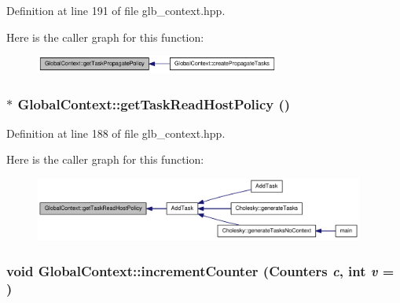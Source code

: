 Definition at line 191 of file glb\_\-context.hpp.

Here is the caller graph for this function:\nopagebreak
\begin{figure}[H]
\begin{center}
\leavevmode
\includegraphics[width=228pt]{class_global_context_a70524a314df10d540b267f34d297ec49_icgraph}
\end{center}
\end{figure}
\hypertarget{class_global_context_ab7afe64dbb26b367d9d49f098de7f158}{
\subsubsection[{getTaskReadHostPolicy}]{$\ast$ GlobalContext::getTaskReadHostPolicy ()}}
\label{class_global_context_ab7afe64dbb26b367d9d49f098de7f158}


Definition at line 188 of file glb\_\-context.hpp.

Here is the caller graph for this function:\nopagebreak
\begin{figure}[H]
\begin{center}
\leavevmode
\includegraphics[width=307pt]{class_global_context_ab7afe64dbb26b367d9d49f098de7f158_icgraph}
\end{center}
\end{figure}
\hypertarget{class_global_context_a9348325efe41d1edae48c4313d07dc1a}{
\subsubsection[{incrementCounter}]{\setlength{\rightskip}{0pt plus 5cm}void GlobalContext::incrementCounter ({\bf Counters} {\em c}, \/  int {\em v} = {})}}
\label{class_global_context_a9348325efe41d1edae48c4313d07dc1a}


